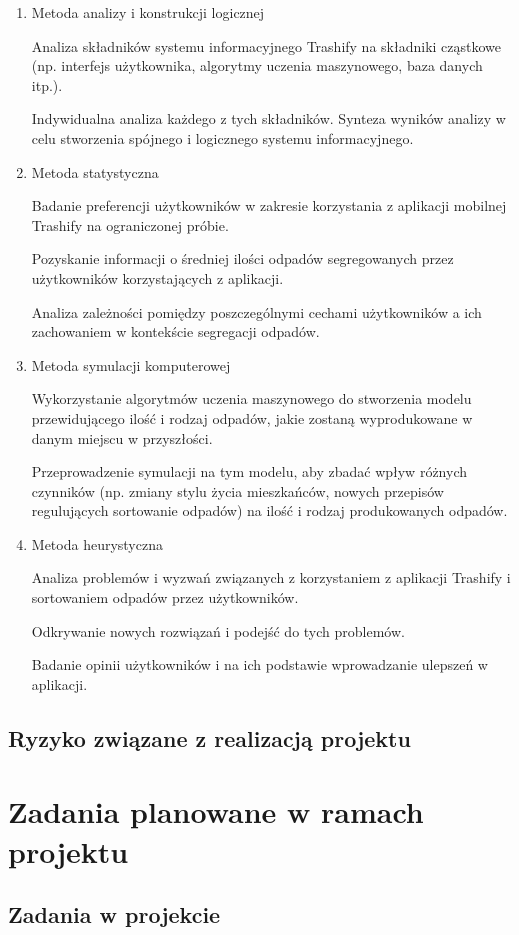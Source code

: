 \documentclass[12pt,oneside]{book}
\begin{document}
\begin{enumerate}
    \item Metoda analizy i konstrukcji logicznej
    
    Analiza składników systemu informacyjnego Trashify na składniki cząstkowe (np. interfejs użytkownika, algorytmy uczenia maszynowego, baza danych itp.).

    Indywidualna analiza każdego z tych składników.
    Synteza wyników analizy w celu stworzenia spójnego i logicznego systemu informacyjnego.
    \item Metoda statystyczna
    
    Badanie preferencji użytkowników w zakresie korzystania z aplikacji mobilnej Trashify na ograniczonej próbie.

    Pozyskanie informacji o średniej ilości odpadów segregowanych przez użytkowników korzystających z aplikacji.

    Analiza zależności pomiędzy poszczególnymi cechami użytkowników a ich zachowaniem w kontekście segregacji odpadów.    
    \item Metoda symulacji komputerowej
    
    Wykorzystanie algorytmów uczenia maszynowego do stworzenia modelu przewidującego ilość i rodzaj odpadów, jakie zostaną wyprodukowane w danym miejscu w przyszłości.
    
    Przeprowadzenie symulacji na tym modelu, aby zbadać wpływ różnych czynników (np. zmiany stylu życia mieszkańców, nowych przepisów regulujących sortowanie odpadów) na ilość i rodzaj produkowanych odpadów.

    \item Metoda heurystyczna
    
    Analiza problemów i wyzwań związanych z korzystaniem z aplikacji Trashify i sortowaniem odpadów przez użytkowników.

    Odkrywanie nowych rozwiązań i podejść do tych problemów.
    
    Badanie opinii użytkowników i na ich podstawie wprowadzanie ulepszeń w aplikacji.
\end{enumerate}

\section{Ryzyko związane z realizacją projektu}

{\let\clearpage\relax\chapter{Zadania planowane w ramach projektu}}

\section{Zadania w projekcie}
\end{document}

